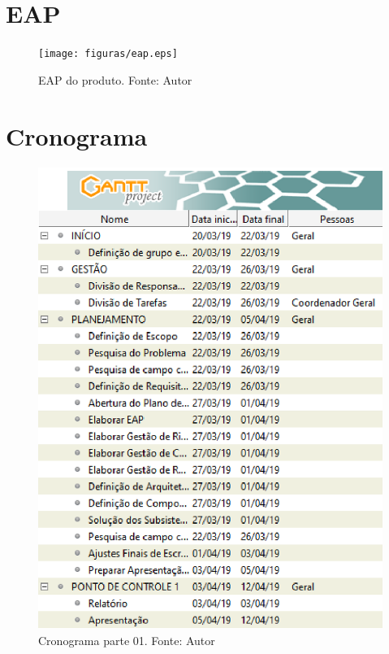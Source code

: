 \begin{apendicesenv}

\partapendices

\chapter{EAP} \label{apendice:eap}

\begin{figure}[ht]
    \centering
    \texttt{[image: figuras/eap.eps]}
    \caption[EAP do produto.]{EAP do produto. Fonte: Autor}
    \label{fig:eap}
\end{figure}

\chapter{Cronograma} \label{apendice:cronograma}

\begin{figure}[ht]
    \centering
    \includegraphics[keepaspectratio=true,scale=1]{figuras/C1.eps}
    \caption[Cronograma parte 01.]{Cronograma parte 01. Fonte: Autor}
    \label{fig:cronograma1}
\end{figure}


\end{apendicesenv}
